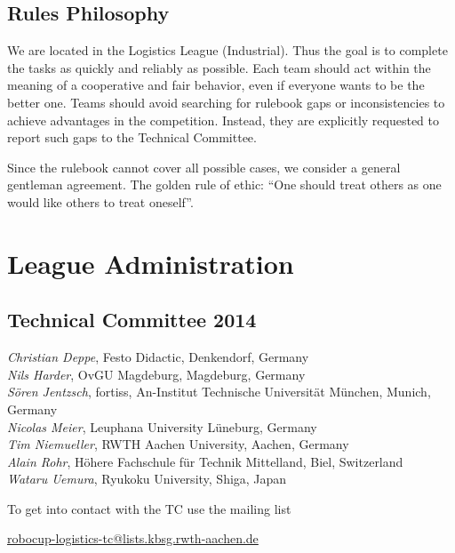 \documentclass[12pt,twoside]{article}
\begin{document}
\subsection{Rules Philosophy}
\label{sec:rules-philosphy}
We are located in the Logistics League (Industrial). Thus the goal is
to complete the tasks as quickly and reliably as possible. Each team
should act within the meaning of a cooperative and fair behavior,
even if everyone wants to be the better one. Teams should avoid
searching for rulebook gaps or inconsistencies to achieve advantages
in the competition. Instead, they are explicitly requested to report
such gaps to the Technical Committee.

Since the rulebook cannot cover all possible cases, we consider a
general gentleman agreement. The golden rule of ethic: ``One should
treat others as one would like others to treat oneself''.


\section{League Administration} \label{sec:commitees}
\subsection{Technical Committee 2014} \label{sec:tc}
\emph{Christian Deppe}, Festo Didactic, Denkendorf, Germany\\
\emph{Nils Harder}, OvGU Magdeburg, Magdeburg, Germany\\
\emph{S\"oren Jentzsch}, fortiss, An-Institut Technische Universit\"at M\"unchen, Munich, Germany\\
\emph{Nicolas Meier}, Leuphana University Lüneburg, Germany\\
\emph{Tim Niemueller}, RWTH Aachen University, Aachen, Germany\\
\emph{Alain Rohr}, Höhere Fachschule für Technik Mittelland, Biel, Switzerland\\
\emph{Wataru Uemura}, Ryukoku University, Shiga, Japan\\
\medskip

\noindent
To get into contact with the TC use the mailing list\\
\centerline{\url{robocup-logistics-tc@lists.kbsg.rwth-aachen.de}}
\end{document}
